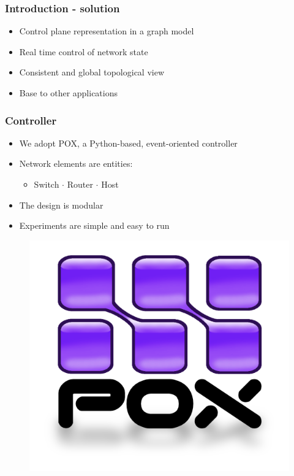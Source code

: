 %
%
\begin{frame}\frametitle{Introduction - solution}

    \begin{itemize}
        \item Control plane representation in a graph model
        \item Real time control of network state
        \item Consistent and global topological view
        \item Base to other applications
    \end{itemize}

\end{frame}



%
%
\begin{frame}\frametitle{Controller}

    \begin{itemize}
        \item We adopt POX, a Python-based, event-oriented controller
        \item Network elements are entities:
            \begin{itemize}
                \item Switch $\cdot$ Router $\cdot$ Host
            \end{itemize}
        \item The design is modular
        \item Experiments are simple and easy to run
    \end{itemize}

	\begin{figure}[h]
        \centering
        \includegraphics[scale=0.2]{img/pox.png}
    \end{figure}
\end{frame}
